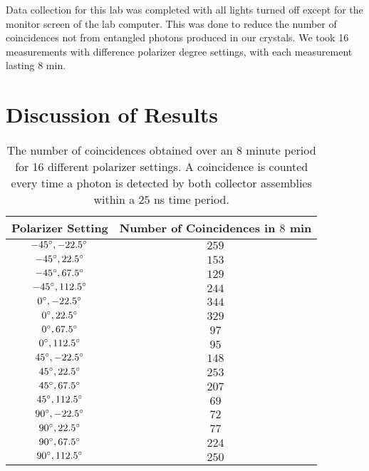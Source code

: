 \documentclass[11pt,letterpaper]{article}
\begin{document}
Data collection for this lab was completed with all lights turned off except for the monitor screen of the lab computer. This was done to reduce the number of coincidences not from entangled photons produced in our crystals. We took 16 measurements with difference polarizer degree settings, with each measurement lasting $8$ min. 


\section{Discussion of Results}

\begin{table}[h]
    \centering
    \begin{tabular}{c|c} \hline \hline
        Polarizer Setting & Number of Coincidences in $8$ min \\
        \hline $-45\degree, -22.5\degree$ & $259$ \\
        \hline $-45\degree, 22.5\degree$ & $153$ \\
        \hline $-45\degree, 67.5\degree$ & $129$ \\
        \hline $-45\degree, 112.5\degree$ & $244$ \\
        \hline $0\degree, -22.5\degree$ & $344$ \\
        \hline $0\degree, 22.5\degree$ & $329$ \\
        \hline $0\degree, 67.5\degree$ & $97$ \\
        \hline $0\degree, 112.5\degree$ & $95$  \\
        \hline $45\degree, -22.5\degree$ & $148$ \\
        \hline $45\degree, 22.5\degree$ & $253$ \\
        \hline $45\degree, 67.5\degree$ & $207$ \\
        \hline $45\degree, 112.5\degree$ & $69$ \\
        \hline $90\degree, -22.5\degree$ & $72$ \\
        \hline $90\degree, 22.5\degree$ & $77$ \\
        \hline $90\degree, 67.5\degree$ & $224$ \\
        \hline $90\degree, 112.5\degree$ & $250$ \\
         \hline \hline
    \end{tabular}
    \caption{The number of coincidences obtained over an 8 minute period for 16 different polarizer settings. A coincidence is counted every time a photon is detected by both collector assemblies within a $25$ ns time period.}
    \label{coincidences}
\end{table}
\end{document}
